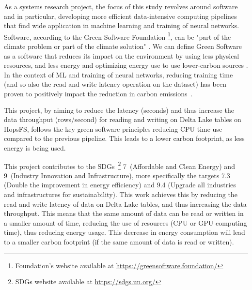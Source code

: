 As a systems research project, the focus of this study revolves around software and in particular, developing more efficient data-intensive computing pipelines that find wide application in machine learning and training of neural networks. Software, according to the Green Software Foundation \footnote{Foundation's website available at \url{https://greensoftware.foundation/}}, can be "part of the climate problem or part of the climate solution" \cite{WhatGreenSoftware2021}. We can define Green Software as a software that reduces its impact on the environment by using less physical resources, and less energy and optimizing energy use to use lower-carbon sources \cite{WhatGreenSoftware2021}. In the context of \gls{ML} and training of neural networks, reducing training time (and so also the read and write latency operation on the dataset) has been proven to positively impact the reduction in carbon emissions~\cite{pattersonCarbonEmissionsLarge2021,pattersonCarbonFootprintMachine2022}.

This project, by aiming to reduce the latency (seconds) and thus increase the data throughput (rows/second) for reading and writing on Delta Lake tables on \gls{HopsFS}, follows the key green software principles reducing \gls{CPU} time use compared to the previous pipeline. This leads to a lower carbon footprint, as less energy is being used.

This project contributes to the \glspl{SDG}~\footnote{\glspl{SDG} website available at \url{https://sdgs.un.org/}} 7~(Affordable and Clean Energy) and 9~(Industry Innovation and Infrastructure), more specifically the targets 7.3 (Double the improvement in energy efficiency) and 9.4 (Upgrade all industries and infrastructures for sustainability). This work achieves this by reducing the read and write latency of data on Delta Lake tables, and thus increasing the data throughput. This means that the same amount of data can be read or written in a smaller amount of time, reducing the use of resources (\gls{CPU} or \gls{GPU} computing time), thus reducing energy usage. This decrease in energy consumption will lead to a smaller carbon footprint (if the same amount of data is read or written). 

